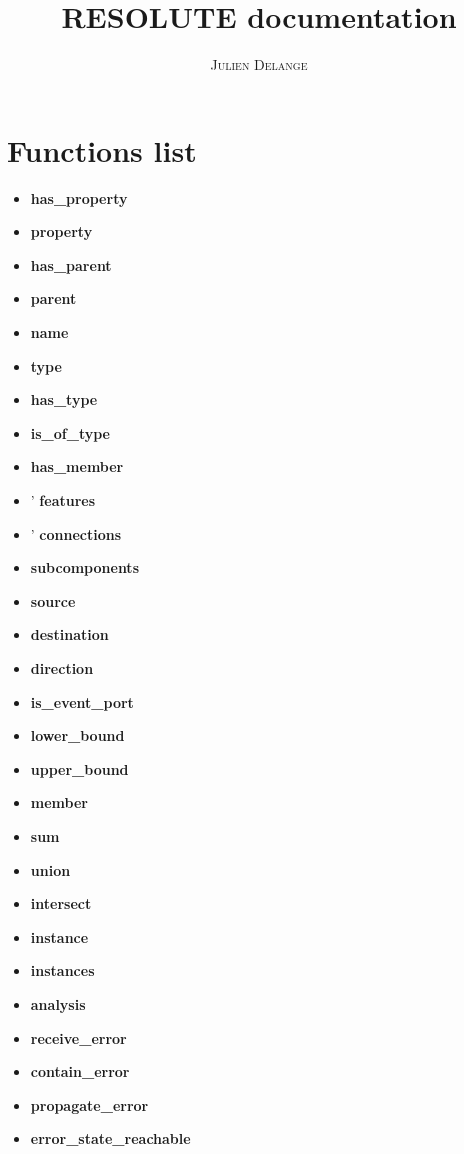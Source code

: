 \documentclass[times, 10pt]{article}
\title{RESOLUTE documentation}
\author{\textsc{Julien Delange}}\\
\begin{document}
\maketitle

\section{Functions list}
\begin{itemize}
    \item
	    \textbf{has\_property}
    \item
	    \textbf{property}
    \item
	    \textbf{has\_parent}
    \item
	    \textbf{parent}
    \item
	    \textbf{name}
    \item
	    \textbf{type}
    \item
	    \textbf{has\_type}
    \item
        \textbf{is\_of\_type}
    \item
	    \textbf{has\_member}
    \item
   '    \textbf{features}
    \item
	'   \textbf{connections}

    \item
	    \textbf{subcomponents}

    \item
        \textbf{source}

    \item
        \textbf{destination}

    \item
        \textbf{direction}

    \item
        \textbf{is\_event\_port}
    \item
        \textbf{lower\_bound}
    \item
        \textbf{upper\_bound}
    \item
        \textbf{member}
    \item
        \textbf{sum}
    \item
        \textbf{union}
    \item
        \textbf{intersect}
    \item
        \textbf{instance}
    \item
        \textbf{instances}
    \item
        \textbf{analysis}
    \item
        \textbf{receive\_error}
    \item
        \textbf{contain\_error}
    \item
        \textbf{propagate\_error}
    \item
        \textbf{error\_state\_reachable}
\end{itemize}
\end{document}
